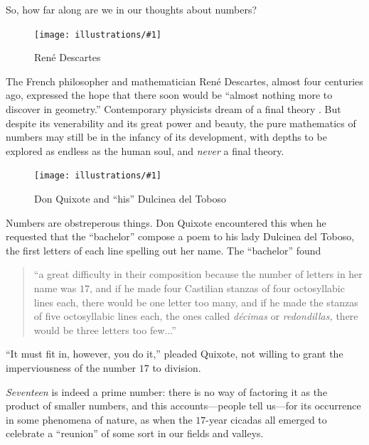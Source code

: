 \documentclass[openany]{book}
\newcommand{\ill}[3]{%
   \begin{figure}[H]%
   \vspace{-2ex}
   \centering%
   \texttt{[image: illustrations/\#1]}%
   \caption{#3}%
   \vspace{-2ex}
    \end{figure}}
\theoremstyle{plain}
\theoremstyle{definition}
\begin{document}
So, how far along are we in our thoughts about numbers?




\ill{descartes}{.25}{Ren\'e Descartes}

The French philosopher and mathematician Ren\'e Descartes, almost four
centuries ago, expressed the hope that there soon would be ``almost
nothing more to discover in geometry.'' Contemporary physicists dream
of a final theory .  But despite its
venerability and its great power and beauty, the pure mathematics of
numbers may still be in the infancy of its development, with depths to
be explored as endless as the human soul, and {\it never} a final theory.



\ill{dulcinea1}{.2}{Don Quixote and ``his'' Dulcinea del Toboso}

Numbers are obstreperous things. Don Quixote encountered this when he
requested that the ``bachelor'' compose a poem to his lady Dulcinea del
Toboso, the first letters of each line spelling out her name. The
``bachelor'' found




\begin{quote}
  ``a great difficulty in their composition because the number of
  letters in her name was $17$, and if he made four Castilian stanzas
  of four octosyllabic lines each, there would be one letter too many,
  and if he made the stanzas of five octosyllabic lines each, the ones
  called {\em d{\'e}cimas} or {\em redondillas,} there would be three
  letters too few...'' 
\end{quote}

``It must fit in, however, you do it,'' pleaded Quixote, not willing to
grant the imperviousness of the number $17$ to division.





{\em Seventeen} is indeed a prime number: there is no way of factoring
it as the product of smaller numbers, and this accounts---people tell
us---for its occurrence in some phenomena of nature, as when
the $17$-year cicadas all emerged to celebrate a ``reunion'' of some
sort in our fields and valleys.
\end{document}
